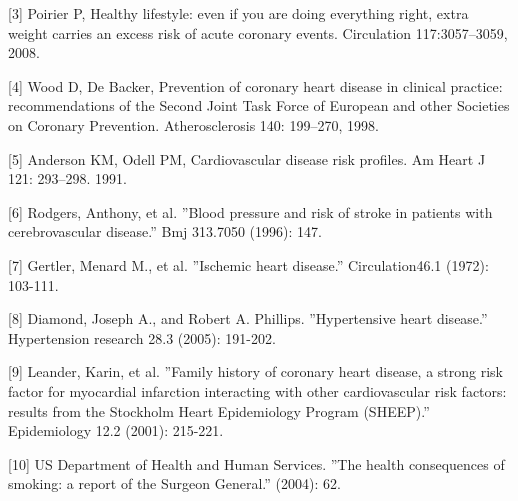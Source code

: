 \documentclass{article}
\begin{document}
[3] Poirier P, Healthy lifestyle: even if you are doing everything right, extra weight carries an excess risk of acute coronary events. Circulation 117:3057–3059, 2008.

[4] Wood D, De Backer, Prevention of coronary heart disease in clinical practice: recommendations of the Second Joint Task Force of European and other Societies on Coronary Prevention. Atherosclerosis 140: 199–270, 1998.

[5] Anderson KM, Odell PM, Cardiovascular disease risk profiles. Am Heart J 121: 293–298. 1991.

[6] Rodgers, Anthony, et al. ”Blood pressure and risk of stroke in patients with cerebrovascular disease.” Bmj 313.7050 (1996): 147.

[7] Gertler, Menard M., et al. ”Ischemic heart disease.” Circulation46.1 (1972): 103-111.

[8] Diamond, Joseph A., and Robert A. Phillips. ”Hypertensive heart disease.” Hypertension research 28.3 (2005): 191-202.

[9] Leander, Karin, et al. ”Family history of coronary heart disease, a strong risk factor for myocardial infarction interacting with other cardiovascular risk factors: results from the Stockholm Heart Epidemiology Program (SHEEP).” Epidemiology 12.2 (2001): 215-221.

[10] US Department of Health and Human Services. ”The health consequences of smoking: a report of the Surgeon General.” (2004): 62.
\end{document}
